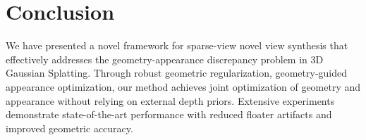 \section{Conclusion}
\label{sec:conc}

We have presented a novel framework for sparse-view novel view synthesis that effectively addresses the geometry-appearance discrepancy problem in 3D Gaussian Splatting. 
Through robust geometric regularization, geometry-guided appearance optimization, our method achieves joint optimization of geometry and appearance without relying on external depth priors. Extensive experiments demonstrate state-of-the-art performance with reduced floater artifacts and improved geometric accuracy.

